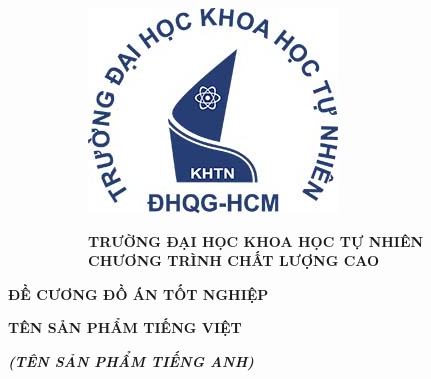 \begin{titlepage}
    \centering
    \begin{figure}
        \begin{subfigure}[c][][t]{0.2\textwidth}
            \includegraphics[width=\textwidth]{images/logo.jpg}
        \end{subfigure}
        \hspace{40pt}
        \begin{subfigure}[c][][t]{0.69\textwidth}
            \centering
            \textbf{TRƯỜNG ĐẠI HỌC KHOA HỌC TỰ NHIÊN\\
                    CHƯƠNG TRÌNH CHẤT LƯỢNG CAO}
        \end{subfigure}
    \end{figure}
    
    \vspace*{20pt}

    \textbf{\large ĐỀ CƯƠNG ĐỒ ÁN TỐT NGHIỆP}\\
    
    \vspace{10pt}
    
    \textbf{\LARGE TÊN SẢN PHẨM TIẾNG VIỆT}

    \vspace{10pt}

    \textbf{\textsl{\large (TÊN SẢN PHẨM TIẾNG ANH)}}
\end{titlepage}